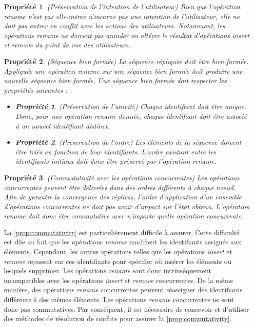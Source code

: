 \documentclass[12pt]{thesul}
\newtheorem{property}{Propriété}
\newtheorem{subproperty}{Propriété}[property]
\begin{document}
\begin{property}(Préservation de l'intention de l'utilisateur)
  Bien que l'opération \emph{rename} n'est pas elle-même n'incarne pas une intention de l'utilisateur, elle ne doit pas entrer en conflit avec les actions des utilisateurs.
  Notamment, les opérations \emph{rename} ne doivent pas annuler ou altérer le résultat d'opérations \emph{insert} et \emph{remove} du point de vue des utilisateurs.
\end{property}

\begin{property}(Séquence bien formée)
  La séquence répliquée doit être bien formée.
  Appliquée une opération \emph{rename} sur une séquence bien formée doit produire une nouvelle séquence bien formée.
  Une séquence bien formée doit respecter les propriétés suivantes :
  \begin{itemize}[noitemsep]
    \item[~]
    \begin{subproperty}(Préservation de l'unicité)
      Chaque identifiant doit être unique.
      Donc, pour une opération \emph{rename} donnée, chaque identifiant doit être associé à un nouvel identifiant distinct.
    \end{subproperty}
    \item[~]
    \begin{subproperty}(Préservation de l'ordre)
      \label{prop:order}
      Les éléments de la séquence doivent être triés en fonction de leur identifiants.
      L'ordre existant entre les identifiants initiaux doit donc être préservé par l'opération \emph{rename}.
    \end{subproperty}
  \end{itemize}
\end{property}

\begin{property}(Commutativité avec les opérations concurrentes)
  \label{prop:commutativity}
  Les opérations concurrentes peuvent être délivrées dans des ordres différents à chaque noeud.
  Afin de garantir la convergence des réplicas, l'ordre d'application d'un ensemble d'opérations concurrentes ne doit pas avoir d'impact sur l'état obtenu.
  L'opération \emph{rename} doit donc être commutative avec n'importe quelle opération concurrente.
\end{property}

La \autoref{prop:commutativity} est particulièrement difficile à assurer.
Cette difficulté est dûe au fait que les opérations \emph{rename} modifient les identifiants assignés aux éléments.
Cependant, les autres opérations telles que les opérations \emph{insert} et \emph{remove} reposent sur ces identifiants pour spécifier où insérer les éléments ou lesquels supprimer.
Les opérations \emph{rename} sont donc intrinséquement incompatibles avec les opérations \emph{insert} et \emph{remove} concurrentes.
De la même manière, des opérations \emph{rename} concurrentes peuvent réassigner des identifiants différents à des mêmes éléments.
Les opérations \emph{rename} concurrentes ne sont donc pas commutatives.
Par conséquent, il est nécessaire de concevoir et d'utiliser des méthodes de résolution de conflits pour assurer la \autoref{prop:commutativity}.
\end{document}
